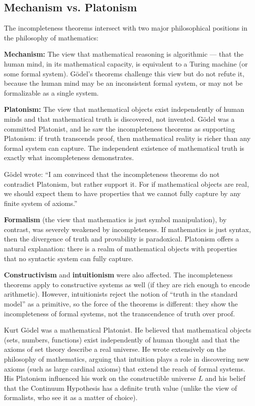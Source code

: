 \subsection{Mechanism vs. Platonism}
\label{sec:godel:mechanism_platonism}

The incompleteness theorems intersect with two major philosophical positions in the philosophy of mathematics:

\textbf{Mechanism:} The view that mathematical reasoning is algorithmic --- that the human mind, in its mathematical capacity, is equivalent to a Turing machine (or some formal system). Gödel's theorems challenge this view but do not refute it, because the human mind may be an inconsistent formal system, or may not be formalizable as a single system.

\textbf{Platonism:} The view that mathematical objects exist independently of human minds and that mathematical truth is discovered, not invented. Gödel was a committed Platonist, and he saw the incompleteness theorems as supporting Platonism: if truth transcends proof, then mathematical reality is richer than any formal system can capture. The independent existence of mathematical truth is exactly what incompleteness demonstrates.

Gödel wrote: ``I am convinced that the incompleteness theorems do not contradict Platonism, but rather support it. For if mathematical objects are real, we should expect them to have properties that we cannot fully capture by any finite system of axioms.''

\textbf{Formalism} (the view that mathematics is just symbol manipulation), by contrast, was severely weakened by incompleteness. If mathematics is just syntax, then the divergence of truth and provability is paradoxical. Platonism offers a natural explanation: there is a realm of mathematical objects with properties that no syntactic system can fully capture.

\textbf{Constructivism} and \textbf{intuitionism} were also affected. The incompleteness theorems apply to constructive systems as well (if they are rich enough to encode arithmetic). However, intuitionists reject the notion of ``truth in the standard model'' as a primitive, so the force of the theorems is different: they show the incompleteness of formal systems, not the transcendence of truth over proof.

Kurt Gödel was a mathematical Platonist. He believed that mathematical objects (sets, numbers, functions) exist independently of human thought and that the axioms of set theory describe a real universe. He wrote extensively on the philosophy of mathematics, arguing that intuition plays a role in discovering new axioms (such as large cardinal axioms) that extend the reach of formal systems. His Platonism influenced his work on the constructible universe $L$ and his belief that the Continuum Hypothesis has a definite truth value (unlike the view of formalists, who see it as a matter of choice).

